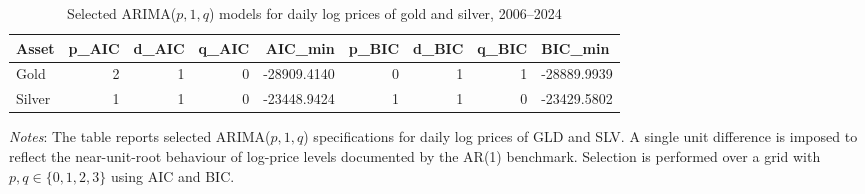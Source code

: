 \begin{table}[H]
\centering
\caption{Selected ARIMA($p,1,q$) models for daily log prices of gold and silver, 2006--2024}
\label{tab:arima-selection}
\begin{tabular}{lrrrrrrr}
\toprule
Asset & p_AIC & d_AIC & q_AIC & AIC_min & p_BIC & d_BIC & q_BIC & BIC_min \\
\midrule
Gold & 2 & 1 & 0 & -28909.4140 & 0 & 1 & 1 & -28889.9939 \\
Silver & 1 & 1 & 0 & -23448.9424 & 1 & 1 & 0 & -23429.5802 \\
\bottomrule
\end{tabular}

\vspace{0.2cm}
\begin{minipage}{0.9\textwidth}
\footnotesize
\textit{Notes}: The table reports selected ARIMA($p,1,q$) specifications for daily log prices of GLD and SLV. A single unit difference is imposed to reflect the near-unit-root behaviour of log-price levels documented by the AR(1) benchmark. Selection is performed over a grid with $p,q \in \{0,1,2,3\}$ using AIC and BIC.
\end{minipage}
\end{table}
